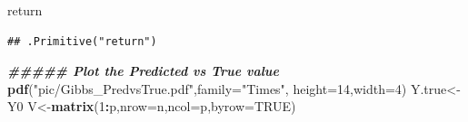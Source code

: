 \documentclass[12pt]{article}
\newenvironment{Shaded}{\begin{snugshade}}{\end{snugshade}}
\newcommand{\AttributeTok}[1]{\textcolor[rgb]{0.13,0.29,0.53}{#1}}
\newcommand{\ConstantTok}[1]{\textcolor[rgb]{0.56,0.35,0.01}{#1}}
\newcommand{\DecValTok}[1]{\textcolor[rgb]{0.00,0.00,0.81}{#1}}
\newcommand{\DocumentationTok}[1]{\textcolor[rgb]{0.56,0.35,0.01}{\textbf{\textit{#1}}}}
\newcommand{\FunctionTok}[1]{\textcolor[rgb]{0.13,0.29,0.53}{\textbf{#1}}}
\newcommand{\NormalTok}[1]{#1}
\newcommand{\OtherTok}[1]{\textcolor[rgb]{0.56,0.35,0.01}{#1}}
\newcommand{\SpecialCharTok}[1]{\textcolor[rgb]{0.81,0.36,0.00}{\textbf{#1}}}
\newcommand{\StringTok}[1]{\textcolor[rgb]{0.31,0.60,0.02}{#1}}
\begin{document}
\begin{Shaded}
\begin{Highlighting}[]
\NormalTok{return}
\end{Highlighting}
\end{Shaded}

\begin{verbatim}
## .Primitive("return")
\end{verbatim}

\begin{Shaded}
\begin{Highlighting}[]
\DocumentationTok{\#\#\#\#\# Plot the Predicted vs True value}
\FunctionTok{pdf}\NormalTok{(}\StringTok{"pic/Gibbs\_PredvsTrue.pdf"}\NormalTok{,}\AttributeTok{family=}\StringTok{"Times"}\NormalTok{, }\AttributeTok{height=}\DecValTok{14}\NormalTok{,}\AttributeTok{width=}\DecValTok{4}\NormalTok{)}
\NormalTok{Y.true}\OtherTok{\textless{}{-}}\NormalTok{Y0}
\NormalTok{V}\OtherTok{\textless{}{-}}\FunctionTok{matrix}\NormalTok{(}\DecValTok{1}\SpecialCharTok{:}\NormalTok{p,}\AttributeTok{nrow=}\NormalTok{n,}\AttributeTok{ncol=}\NormalTok{p,}\AttributeTok{byrow=}\ConstantTok{TRUE}\NormalTok{)}


\end{Highlighting}
\end{Shaded}
\end{document}
